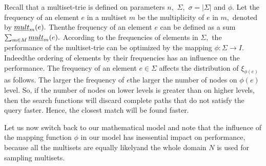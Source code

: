 \documentclass[10pt,letterpaper]{article}
\newtheorem{lemma}{Lemma}
\providecommand{\DIFaddtex}[1]{{\protect\color{blue}\uwave{#1}}} %
\providecommand{\DIFaddbegin}{} %
\providecommand{\DIFaddend}{} %
\providecommand{\DIFadd}[1]{\texorpdfstring{\DIFaddtex{#1}}{#1}} %
\newcommand{\DIFaddincludegraphics}[2][]{{\color{blue}\fbox{\DIFOincludegraphics[#1]{#2}}}} %
\DeclareRobustCommand{\DIFaddbegin}{\DIFOaddbegin \let\includegraphics\DIFaddincludegraphics} %
\DeclareRobustCommand{\DIFaddend}{\DIFOaddend \let\includegraphics\DIFOincludegraphics} %
\begin{document}
Recall that a multiset-trie is defined on parameters $n,$ $\Sigma,$ $\sigma = |\Sigma|$ 
and $\phi.$ Let the frequency of an element $e$ in a multiset $m$ be the multiplicity of 
$e$ in $m,$ denoted by $\emph{mult}_m(e).$ Then\DIFaddbegin \DIFadd{, }\DIFaddend the frequency of an element $e$ 
can be defined as a sum $\sum_{m\in M} \emph{mult}_m(e).$ According to the frequencies 
of elements in $\Sigma,$ the performance of the multiset-trie can be optimized by 
the mapping $\phi : \Sigma \rightarrow I.$ Indeed\DIFaddbegin \DIFadd{, }\DIFaddend the ordering of elements by their 
frequencies has an influence on the performance.
%
The frequency of an element $e\in\Sigma$ affects the distribution of $\xi_{\phi(e)}$ 
as follows. The larger the frequency of $e$\DIFaddbegin \DIFadd{, }\DIFaddend the larger the number of nodes on 
$\phi(e)$ level. 
So, if the number of nodes on lower levels is greater than on higher levels, then 
the search functions will discard complete paths that do not satisfy the query 
faster. Hence, the closest match will be found faster.

%

Let us now switch back to our mathematical model and note that the influence 
of the mapping function $\phi$ in our model has \DIFaddbegin \DIFadd{an }\DIFaddend inessential impact on performance, 
because all the multisets are equally likely\DIFaddbegin \DIFadd{, }\DIFaddend and the whole domain $N$ is used for 
sampling multisets. 
\end{document}
